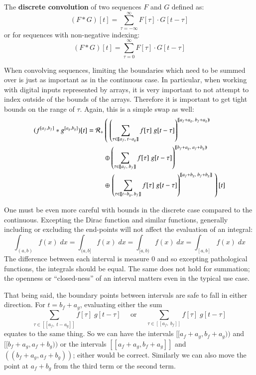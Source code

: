 

\begin{definition}
	The \textbf{discrete convolution} of two sequences $F$ and $G$ defined as:
	\begin{equation}
		(F*G)[t] = \sum_{\tau=-\infty}^\infty F[\tau] \cdot G[t-\tau]
	\end{equation}
	or for sequences with non-negative indexing:
	\begin{equation}
		(F*G)[t] = \sum_{\tau=0}^\infty F[\tau] \cdot G[t-\tau]
	\end{equation}
\end{definition}

When convolving sequences, limiting the boundaries which need to be summed over is just as important as in the
continuous case.
In particular, when working with digital inputs represented by arrays, it is very important to not attempt to index outside of
the bounds of the arrays.
Therefore it is important to get tight bounds on the range of $\tau$.
Again, this is a simple swap as well:
\begin{align}
	(f^{[a_f,b_f]} * g^{[a_g, b_g]})[t] = 
		\R[+] &\left( \; \left( 
			\sum_{\tau \in [\![a_f,\;t-a_g]\!]} f[\tau] \; g[t-\tau] \right)^{[\![a_f+a_g,\; b_f+a_g)\!)} 
				\right. \notag \\ &\oplus \left( 
			\sum_{\tau \in [\![a_f,\;b_f]\!]} f[\tau] \; g[t-\tau] \right)^{[\![b_f+a_g,\; a_f+b_g)\!)} 
				\notag \\ &\oplus \left. \left( 
			\sum_{\tau \in [\![t-b_g,\;b_f]\!]} f[\tau] \; g[t-\tau] \right)^{[\![a_f+b_g,\; b_f+b_g]\!]} 
				\; \right)[t]
\end{align}

One must be even more careful with bounds in the discrete case compared to the continuous.
Excepting the Dirac function and similar functions, generally including or excluding the end-points will not affect the
 evaluation of an integral:
\begin{equation*}
	\int_{(a,b)} f(x)\; dx = \int_{(a,b]}f(x)\; dx = \int_{[a,b)} f(x)\; dx = \int_{[a,b]} f(x)\;dx
\end{equation*}
The difference between each interval is measure 0 and so excepting pathological functions, the integrals should be equal.
The same does not hold for summation; the openness or ``closed-ness'' of an interval matters even in the typical use case.


That being said, the boundary points between intervals are safe to fall in either direction.
For $t=b_f+a_g$, evaluating either the sum
\begin{equation*}
	\sum_{\tau \in [\![a_f,\;t-a_g]\!]} f[\tau] \; g[t-\tau] 
	\;\;\;\;\; \text{or} \;\;\;\;\; 
	\sum_{\tau \in [\![a_f,\;b_f]\!]} f[\tau] \; g[t-\tau]
\end{equation*}
equates to the same thing.
So we can have the intervals $[\![a_f+a_g, b_f+a_g)\!)$ and $[\![b_f+a_g,a_f+b_g)\!)$ or the intervals 
$[\![a_f+a_g, b_f+a_g]\!]$ and $(\!(b_f+a_g,a_f+b_g)\!)$; either would be correct.
Similarly we can also move the point at $a_f+b_g$ from the third term or the second term.


